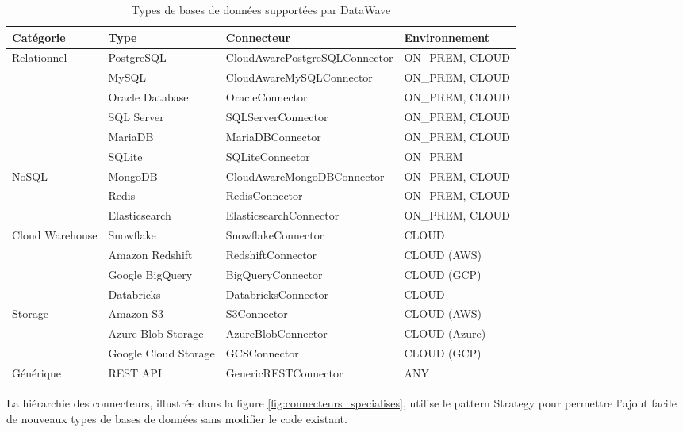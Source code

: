 \begin{table}[htpb]
\centering
\caption{Types de bases de données supportées par DataWave}
\label{tab:types_bd_supportees}
\begin{tabular}{|p{}|p{}|p{}|p{}|}
\hline
\textbf{Catégorie} & \textbf{Type} & \textbf{Connecteur} & \textbf{Environnement} \\
\hline
\multirow{6}{*}{Relationnel} & PostgreSQL & CloudAwarePostgreSQLConnector & ON\_PREM, CLOUD \\
\cline{2-4}
& MySQL & CloudAwareMySQLConnector & ON\_PREM, CLOUD \\
\cline{2-4}
& Oracle Database & OracleConnector & ON\_PREM, CLOUD \\
\cline{2-4}
& SQL Server & SQLServerConnector & ON\_PREM, CLOUD \\
\cline{2-4}
& MariaDB & MariaDBConnector & ON\_PREM, CLOUD \\
\cline{2-4}
& SQLite & SQLiteConnector & ON\_PREM \\
\hline
\multirow{3}{*}{NoSQL} & MongoDB & CloudAwareMongoDBConnector & ON\_PREM, CLOUD \\
\cline{2-4}
& Redis & RedisConnector & ON\_PREM, CLOUD \\
\cline{2-4}
& Elasticsearch & ElasticsearchConnector & ON\_PREM, CLOUD \\
\hline
\multirow{4}{*}{Cloud Warehouse} & Snowflake & SnowflakeConnector & CLOUD \\
\cline{2-4}
& Amazon Redshift & RedshiftConnector & CLOUD (AWS) \\
\cline{2-4}
& Google BigQuery & BigQueryConnector & CLOUD (GCP) \\
\cline{2-4}
& Databricks & DatabricksConnector & CLOUD \\
\hline
\multirow{3}{*}{Storage} & Amazon S3 & S3Connector & CLOUD (AWS) \\
\cline{2-4}
& Azure Blob Storage & AzureBlobConnector & CLOUD (Azure) \\
\cline{2-4}
& Google Cloud Storage & GCSConnector & CLOUD (GCP) \\
\hline
Générique & REST API & GenericRESTConnector & ANY \\
\hline
\end{tabular}
\end{table}

La hiérarchie des connecteurs, illustrée dans la figure \ref{fig:connecteurs_specialises}, utilise le pattern Strategy pour permettre l'ajout facile de nouveaux types de bases de données sans modifier le code existant.

